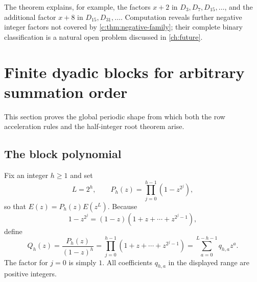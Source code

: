 \documentclass[11pt,a4paper,oneside,openany]{book}
\numberwithin{equation}{chapter}
\theoremstyle{definition}
\theoremstyle{remark}
\newcommand{\Diag}{D}
\begin{document}
The theorem explains, for example, the factors \(x+2\) in
\(\Diag_3,\Diag_7,\Diag_{15},\ldots\), and the additional factor
\(x+8\) in \(\Diag_{15},\Diag_{31},\ldots\).  Computation reveals further
negative integer factors not covered by \cref{c:thm:negative-family}; their
complete binary classification is a natural open problem discussed in
\cref{ch:future}.
\chapter{Finite dyadic blocks for arbitrary summation order}\label{ch:blocks}

This section proves the global periodic shape from which both the row
acceleration rules and the half-integer root theorem arise.

\section{The block polynomial}

Fix an integer \(h\ge1\) and set
\begin{equation}
 L=2^h,
 \qquad
 P_h(z)=\prod_{j=0}^{h-1}(1-z^{2^j}),
 \label{a:eq:Ph-L}
\end{equation}
so that \(E(z)=P_h(z)E(z^L)\).  Because
\[
 1-z^{2^j}=(1-z)(1+z+\cdots+z^{2^j-1}),
\]
define
\begin{equation}
 Q_h(z)=\frac{P_h(z)}{(1-z)^h}
 =\prod_{j=0}^{h-1}(1+z+\cdots+z^{2^j-1})
 =\sum_{a=0}^{L-h-1}q_{h,a}z^a.
 \label{a:eq:Qh-definition}
\end{equation}
The factor for \(j=0\) is simply \(1\).  All coefficients
\(q_{h,a}\) in the displayed range are positive integers.
\end{document}
